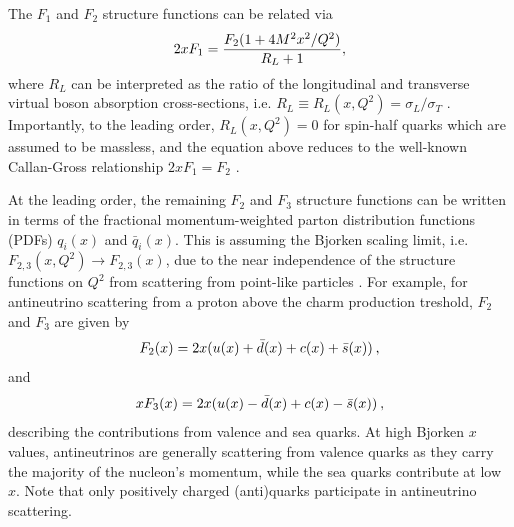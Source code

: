 
The $F_1$ and $F_2$ structure functions can be related via
\vspace{-10pt}
\begin{equation}
    2x F_1 = \frac{F_2 (1+4M^2x^2/Q^2)}{R_L + 1},
    \vspace{-10pt}
    \label{eq:f1f2relationship}
\end{equation}
where $R_L$ can be interpreted as the ratio of the longitudinal and transverse virtual boson absorption cross-sections, i.e. $R_L \equiv R_L(x, Q^2) = \sigma_L/\sigma_T $ \cite{RevModPhys.70.1341}. Importantly, to the leading order, $R_L (x, Q^2) = 0$ for spin-half quarks which are assumed to be massless, and the equation above reduces to the well-known Callan-Gross relationship $2xF_1 = F_2$ \cite{PhysRevLett.22.156}.

At the leading order, the remaining $F_2$ and $F_3$ structure functions can be written in terms of the fractional momentum-weighted parton distribution functions (PDFs) $q_i(x)$ and $\bar{q}_i(x)$. This is assuming the Bjorken scaling limit, i.e. $F_{2,3}(x,Q^2) \rightarrow F_{2,3}(x)$, due to the near independence of the structure functions on $Q^2$ from scattering from point-like particles \cite{Thomson}. For example, for antineutrino scattering from a proton above the charm production treshold, $F_2$ and $F_3$ are given by
\vspace{-12pt}
\begin{equation}
    F_2(x) = 2x(u(x) + \bar{d}(x) + c(x) + \bar{s}(x)) \hspace{2pt},
    \vspace{-25pt}
\end{equation}
and
\vspace{-10pt}
\begin{equation}
    xF_3(x) = 2x(u(x) - \bar{d}(x) + c(x) - \bar{s}(x)) \hspace{2pt},
    \vspace{-5pt}
\end{equation}
describing the contributions from valence and sea quarks. At high Bjorken $x$ values, antineutrinos are generally scattering from valence quarks as they carry the majority of the nucleon's momentum, while the sea quarks contribute at low $x$. Note that only positively charged (anti)quarks participate in antineutrino scattering. 


